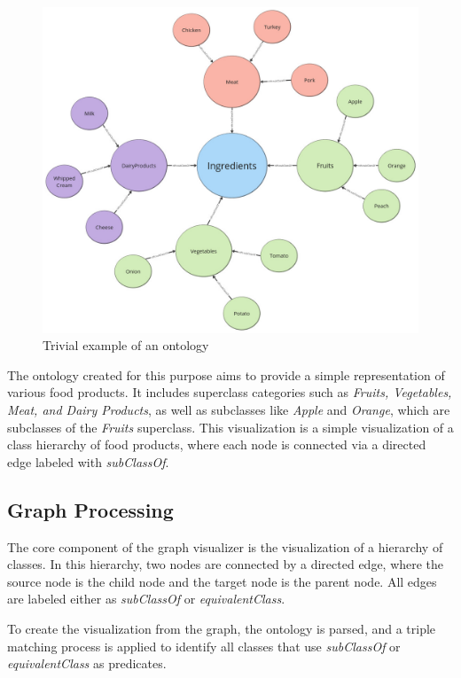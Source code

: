 \begin{figure}[H]
    \centering
    \includegraphics[scale=0.4]{Graphics/simple_ontology.jpg}
    \caption{Trivial example of an ontology}
\end{figure}
    
The ontology created for this purpose aims to provide a simple representation of various food products. 
It includes superclass categories such as \textit{Fruits, Vegetables, Meat, and Dairy Products}, as well as subclasses like \textit{Apple} and \textit{Orange}, 
which are subclasses of the \textit{Fruits} superclass. 
This visualization is a simple visualization of a class hierarchy of food products, where each node is connected via 
a directed edge labeled with \textit{subClassOf}.

\subsection{Graph Processing}
The core component of the graph visualizer is the visualization of a hierarchy of classes. In this hierarchy, two nodes are connected by a directed edge, 
where the source node is the child node and the target node is the parent node. All edges are labeled either as \textit{subClassOf} or \textit{equivalentClass}.

To create the visualization from the graph, the ontology is parsed, and a triple matching process is applied to identify 
all classes that use \textit{subClassOf} or \textit{equivalentClass} as predicates.

